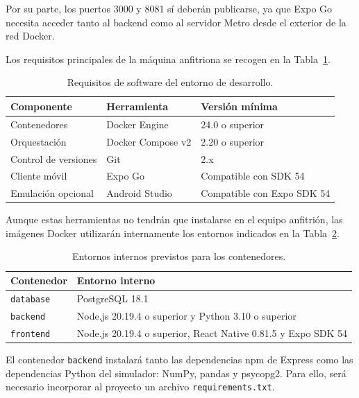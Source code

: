Por su parte, los puertos 3000 y 8081 s\'i deber\'an publicarse, ya que Expo Go
necesita acceder tanto al backend como al servidor Metro desde el exterior de la
red Docker.

Los requisitos principales de la m\'aquina anfitriona se recogen en la
Tabla~\ref{tab:requisitos-host}.

\begin{table}[H]
\centering
\caption{Requisitos de software del entorno de desarrollo.}
\label{tab:requisitos-host}
\begin{tabular}{|p{3.4cm}|p{5cm}|p{4.6cm}|}
\hline
\textbf{Componente} & \textbf{Herramienta} & \textbf{Versi\'on m\'inima} \\
\hline
Contenedores & Docker Engine & 24.0 o superior \\
\hline
Orquestaci\'on & Docker Compose v2 & 2.20 o superior \\
\hline
Control de versiones & Git & 2.x \\
\hline
Cliente m\'ovil & Expo Go & Compatible con SDK 54 \\
\hline
Emulaci\'on opcional & Android Studio & Compatible con Expo SDK 54 \\
\hline
\end{tabular}
\end{table}

Aunque estas herramientas no tendr\'an que instalarse en el equipo anfitri\'on,
las im\'agenes Docker utilizar\'an internamente los entornos indicados en la
Tabla~\ref{tab:entornos-internos}.

\begin{table}[H]
\centering
\caption{Entornos internos previstos para los contenedores.}
\label{tab:entornos-internos}
\begin{tabular}{|p{2.6cm}|p{10.7cm}|}
\hline
\textbf{Contenedor} & \textbf{Entorno interno} \\
\hline
\texttt{database} & PostgreSQL 18.1 \\
\hline
\texttt{backend} & Node.js 20.19.4 o superior y Python 3.10 o superior \\
\hline
\texttt{frontend} & Node.js 20.19.4 o superior, React Native 0.81.5 y Expo SDK 54 \\
\hline
\end{tabular}
\end{table}

El contenedor \texttt{backend} instalar\'a tanto las dependencias npm de Express
como las dependencias Python del simulador: NumPy, pandas y psycopg2. Para ello,
ser\'a necesario incorporar al proyecto un archivo \texttt{requirements.txt}.

